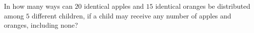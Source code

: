 In how many ways can $20$ identical apples and $15$ identical oranges be distributed among $5$ different children, if a child may receive any number of apples and oranges, including none?
